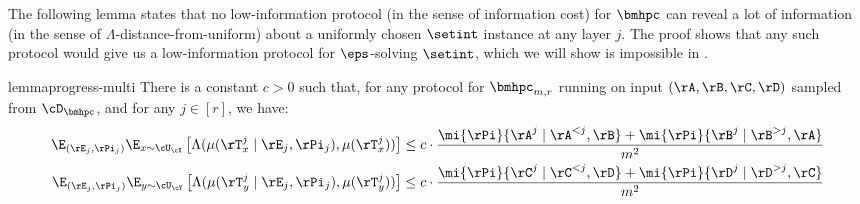 \bigskip\noindent
The following lemma states that no low-information protocol (in the sense of information cost) for $\bmhpc$ can reveal a lot of information (in the sense of $\Lambda$-distance-from-uniform) about a uniformly chosen $\setint$ instance at any layer $j$. The proof shows that any such protocol would give us a low-information protocol for $\eps$-solving $\setint$, which we will show is impossible in .

\begin{restatable}%
{lemma}{progress-multi} \label{lem:progress}
There is a constant $c > 0$ such that, for any protocol for $\bmhpc_{m,r}$
running on input $(\rA,\rB,\rC,\rD)$ sampled from $\cD_{\bmhpc}$, and for any
$j \in [r]$, we have:
\begin{align*}
\E_{(\rE_j, \rPi_j)}\E_{x \sim \cU_\cX}\left[\Lambda(\mu(\rT^j_x \mid \rE_j,
\rPi_j), \mu(\rT^j_x))\right] 
%
\leq  
%
c \cdot \frac{\mi{\rPi}{\rA^j \mid \rA^{< j}, \rB} + \mi{\rPi}{\rB^j \mid \rB^{> j}, \rA}}{m^2}\\
\E_{(\rE_j, \rPi_j)}\E_{y \sim \cU_\cY}\left[\Lambda(\mu(\rT^j_y \mid \rE_j,
\rPi_j), \mu(\rT^j_y))\right] 
%
\leq  
%
c \cdot \frac{\mi{\rPi}{\rC^j \mid \rC^{< j}, \rD} + \mi{\rPi}{\rD^j \mid \rD^{> j}, \rC}}{m^2}\\
\end{align*}
\end{restatable}

